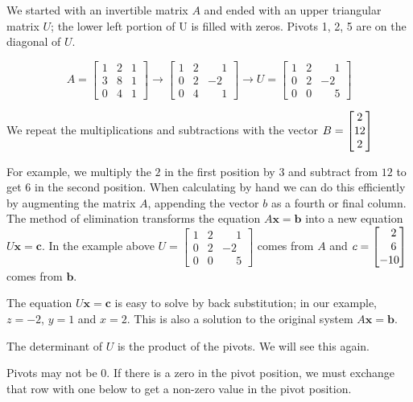 \documentclass{ximera}
\begin{document}
We started with an invertible matrix $A$ and ended with an upper triangular matrix $U$;
the lower left portion of U is filled with zeros. Pivots 1, 2, 5 are on the diagonal
of $U$.

\[A = \begin{bmatrix} 1&2&1\\3&8&1\\0&4&1 \end{bmatrix} \longrightarrow
\begin{bmatrix} 1&2&\phantom{-} 1\\0&2&-2\\0&4&\phantom{-} 1 \end{bmatrix} 
\longrightarrow U = \begin{bmatrix} 1&2&\phantom{-}1\\0&2&-2\\0&0&\phantom{-}5 \end{bmatrix} 
\]

We repeat the multiplications and subtractions with the vector $B = \begin{bmatrix}2\\12\\2\end{bmatrix}$

For example, we multiply the $2$ in the first position by $3$ and subtract from $12$
to get $6$ in the second position. When calculating by hand we can do this efficiently
by augmenting the matrix $A$, appending the vector $b$ as a fourth or final column. 
The method of elimination transforms the equation $A\mathbf{x} = \mathbf{b}$ 
into a new equation $U\mathbf{x} = \mathbf{c}$. In the example above 
$U = \begin{bmatrix} 1&2&\phantom{-}1\\0&2&-2\\0&0&\phantom{-}5 \end{bmatrix}$
comes from $A$ and $c=\begin{bmatrix}\phantom{-}2\\\phantom{-}6\\-10\end{bmatrix}$ comes from 
$\mathbf{b}$.

The equation $U\mathbf{x} = \mathbf{c}$ is easy to solve by back substitution; 
in our example, $z = -2$, $y = 1$ and $x = 2$. This is also a solution to the 
original system $A\mathbf{x} = \mathbf{b}$.

The determinant of $U$ is the product of the pivots. We will see this again.

Pivots may not be $0$. If there is a zero in the pivot position, we must exchange 
that row with one below to get a non-zero value in the pivot position. 
\end{document}
